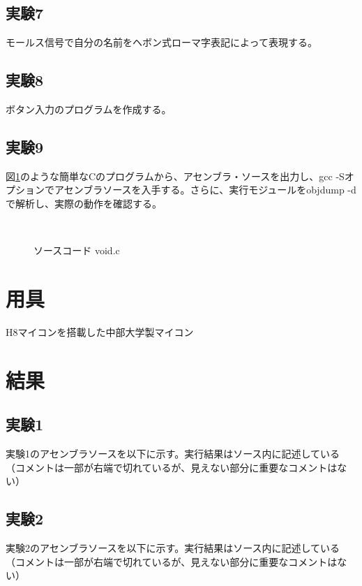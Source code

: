 \documentclass{jarticle}[2012/05/15]
\begin{document}
\subsection{実験7}
モールス信号で自分の名前をヘボン式ローマ字表記によって表現する。
\subsection{実験8}
ボタン入力のプログラムを作成する。
\subsection{実験9}
図\ref{src:void.c}のような簡単なCのプログラムから、アセンブラ・ソースを出力し、gcc -Sオプションでアセンブラソースを入手する。さらに、実行モジュールをobjdump -dで解析し、実際の動作を確認する。
\begin{figure}[htbp]
  {\scriptsize
 　　\caption{ソースコード void.c} \label{src:void.c}
  }
\end{figure}

\section{用具}
H8マイコンを搭載した中部大学製マイコン
\pagebreak

\section{結果}
\subsection{実験1}
実験1のアセンブラソースを以下に示す。実行結果はソース内に記述している（コメントは一部が右端で切れているが、見えない部分に重要なコメントはない）
{\scriptsize
 　　
}
\pagebreak
\subsection{実験2}
実験2のアセンブラソースを以下に示す。実行結果はソース内に記述している（コメントは一部が右端で切れているが、見えない部分に重要なコメントはない）
{\scriptsize
 　　
}
\pagebreak
\end{document}
